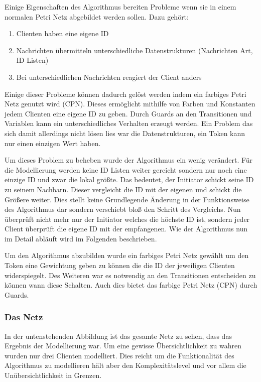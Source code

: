 Einige Eigenschaften des Algorithmus bereiten Probleme wenn sie in einem normalen Petri Netz abgebildet werden sollen. Dazu gehört:
 \begin{enumerate}
 	\item Clienten haben eine eigene ID
	\item Nachrichten übermitteln unterschiedliche Datenstrukturen (Nachrichten Art, ID Listen)
	\item Bei unterschiedlichen Nachrichten reagiert der Client anders
 \end{enumerate}
		 	
Einige dieser Probleme können dadurch gelöst werden indem ein farbiges Petri Netz genutzt wird (CPN). Dieses ermöglicht mithilfe von Farben und Konstanten jedem Clienten eine eigene ID zu geben. Durch Guards an den Transitionen und Variablen kann ein unterschiedliches Verhalten erzeugt werden. Ein Problem das sich damit allerdings nicht lösen lies war die Datenstrukturen, ein Token kann nur einen einzigen Wert haben.

Um dieses Problem zu beheben wurde der Algorithmus ein wenig verändert. Für die Modellierung werden keine ID Listen weiter gereicht sondern nur noch eine einzige ID und zwar die lokal größte. Das bedeutet, der Initiator schickt seine ID zu seinem Nachbarn. Dieser vergleicht die ID mit der eigenen und schickt die Größere weiter. Dies stellt keine Grundlegende Änderung in der Funktionsweise des Algorithmus dar sondern verschiebt bloß den Schritt des Vergleichs. Nun überprüft nicht mehr nur der Initiator welches die höchste ID ist, sondern jeder Client überprüft die eigene ID mit der empfangenen. Wie der Algorithmus nun im Detail abläuft wird im Folgenden beschrieben.

Um den Algorithmus abzubilden wurde ein farbiges Petri Netz gewählt um den Token eine Gewichtung geben zu können die die ID der jeweiligen Clienten widerspiegelt. Des Weiteren war es notwendig an den Transitionen entscheiden zu können wann diese Schalten. Auch dies bietet das farbige Petri Netz (CPN) durch Guards.



\subsubsection{Das Netz}
In der untenstehenden Abbildung ist das gesamte Netz zu sehen, dass das Ergebnis der Modellierung war. Um eine gewisse Übersichtlichkeit zu wahren wurden nur drei Clienten modelliert. Dies reicht um die Funktionalität des Algorithmus zu modellieren hält aber den Komplexitätslevel und vor allem die Unübersichtlichkeit in Grenzen. 


